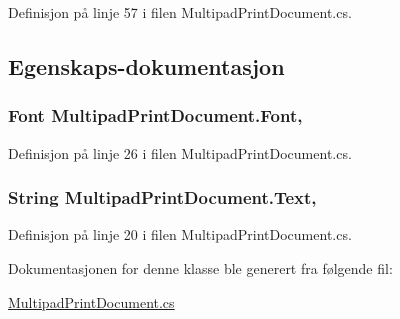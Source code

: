 Definisjon på linje 57 i filen Multipad\+Print\+Document.\+cs.



\subsection{Egenskaps-\/dokumentasjon}
\hypertarget{class_multipad_print_document_aaf1813fbc532697e2d3bfb95c33f9d19}{
\subsubsection[{Font}]{\setlength{\rightskip}{0pt plus 5cm}Font Multipad\+Print\+Document.\+Font\hspace{0.3cm}{\ttfamily [get]}, {\ttfamily [set]}}}\label{class_multipad_print_document_aaf1813fbc532697e2d3bfb95c33f9d19}


Definisjon på linje 26 i filen Multipad\+Print\+Document.\+cs.

\hypertarget{class_multipad_print_document_a9dcbcaa3ddbfc7d34fda92e5409e8723}{
\subsubsection[{Text}]{\setlength{\rightskip}{0pt plus 5cm}String Multipad\+Print\+Document.\+Text\hspace{0.3cm}{\ttfamily [get]}, {\ttfamily [set]}}}\label{class_multipad_print_document_a9dcbcaa3ddbfc7d34fda92e5409e8723}


Definisjon på linje 20 i filen Multipad\+Print\+Document.\+cs.



Dokumentasjonen for denne klasse ble generert fra følgende fil\+:\begin{DoxyCompactItemize}
\item 
\hyperlink{_multipad_print_document_8cs}{Multipad\+Print\+Document.\+cs}\end{DoxyCompactItemize}
